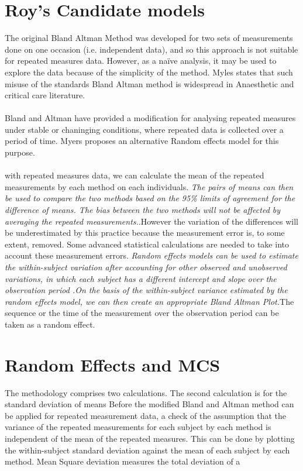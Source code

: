 \documentclass[12pt, a4paper]{report}
\theoremstyle{plain}
\theoremstyle{definition}
\theoremstyle{remark}
\begin{document}
\section{Roy's Candidate models}
The original Bland Altman Method was developed for two sets of
measurements done on one occasion (i.e. independent data), and so
this approach is not suitable for repeated measures data. However,
as a naïve analysis, it may be used to explore the data because of
the simplicity of the method. Myles states that such misuse of the
standards Bland Altman method is widespread in Anaesthetic and
critical care literature.
\\
\\
Bland and Altman have provided a modification for analysing
repeated measures under stable or chaninging conditions, where
repeated data is collected over a period of time. Myers proposes
an alternative Random effects model for this purpose.
\\
\\
with repeated measures data, we can
calculate the mean of the repeated measurements by each method on
each individuals. \emph{ The pairs of means can then be used to
	compare the two methods based on the 95\% limits of agreement for
	the difference of means. The bias between the two methods will not
	be affected by averaging the repeated measurements.}.However the
variation of the differences will be underestimated by this
practice because the measurement error is, to some extent,
removed. Some advanced statistical calculations are needed to take
into account these measurement errors. \emph{Random effects models
	can be used to estimate the within-subject variation after
	accounting for other observed and unobserved variations, in which
	each subject has a different intercept and slope over the
	observation period .On the basis of the within-subject variance
	estimated by the random effects model, we can then create an
	appropriate Bland Altman Plot.}The sequence or the time of the
measurement over the observation period can be taken as a random
effect.








\section{Random Effects and MCS}
The methodology comprises two calculations. The second calculation
is for the standard deviation of means Before the modified Bland
and Altman method can be applied for repeated measurement data, a
check of the assumption that the variance of the repeated
measurements for each subject by each method is independent of the
mean of the repeated measures. This can be done by plotting the
within-subject standard deviation against the mean of each subject
by each method. Mean Square deviation measures the total deviation
of a
\end{document}
